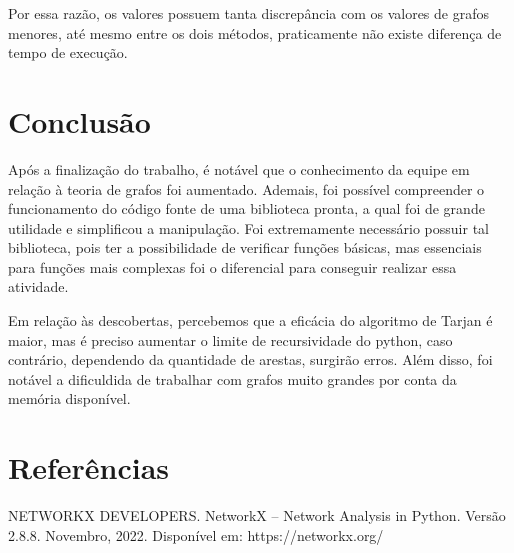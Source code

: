 \documentclass[12pt]{article}
\begin{document}
Por essa razão, os valores possuem tanta discrepância com os valores de grafos menores, até mesmo entre os dois métodos, praticamente não existe diferença de tempo de execução.

\section{Conclusão}

Após a finalização do trabalho, é notável que o conhecimento da equipe em relação à teoria de grafos foi aumentado. Ademais, foi possível compreender o funcionamento do código fonte de uma biblioteca pronta, a qual foi de grande utilidade e simplificou a manipulação. Foi extremamente necessário possuir tal biblioteca, pois ter a possibilidade de verificar funções básicas, mas essenciais para funções mais complexas foi o diferencial para conseguir realizar essa atividade.

Em relação às descobertas, percebemos que a eficácia do algoritmo de Tarjan é maior, mas é preciso aumentar o limite de recursividade do python, caso contrário, dependendo da quantidade de arestas, surgirão erros. Além disso, foi notável a dificuldida de trabalhar com grafos muito grandes por conta da memória disponível.

\section{Referências}

NETWORKX DEVELOPERS. NetworkX -- Network Analysis in Python. Versão 2.8.8. Novembro, 2022. Disponível em: https://networkx.org/
\end{document}
